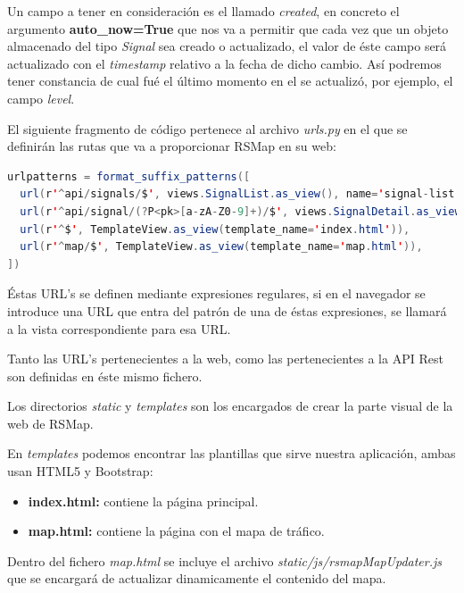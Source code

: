 Un campo a tener en consideración es el llamado \textit{created}, en concreto el argumento \textbf{auto\_now=True} que nos va a permitir que cada vez que un objeto almacenado del tipo \textit{Signal} sea creado o actualizado, el valor de éste campo será actualizado con el \textit{timestamp} relativo a la fecha de dicho cambio. Así podremos tener constancia de cual fué el último momento en el se actualizó, por ejemplo, el campo \textit{level}.


\newpage
El siguiente fragmento de código pertenece al archivo \textit{urls.py} en el que se definirán las rutas que va a proporcionar RSMap en su web:

\begin{lstlisting}[language=java,caption={Definición de URL's},label={lst:pi1}]
urlpatterns = format_suffix_patterns([
  url(r'^api/signals/$', views.SignalList.as_view(), name='signal-list'),
  url(r'^api/signal/(?P<pk>[a-zA-Z0-9]+)/$', views.SignalDetail.as_view(), name='signal-detail'),
  url(r'^$', TemplateView.as_view(template_name='index.html')),
  url(r'^map/$', TemplateView.as_view(template_name='map.html')),
])
\end{lstlisting}

Éstas URL's se definen mediante expresiones regulares, si en el navegador se introduce una URL que entra del patrón de una de éstas expresiones, se llamará a la vista correspondiente para esa URL.

Tanto las URL's pertenecientes a la web, como las pertenecientes a la API Rest son definidas en éste mismo fichero.

\bigskip

Los directorios \textit{static} y \textit{templates} son los encargados de crear la parte visual de la web de RSMap.

En \textit{templates} podemos encontrar las plantillas que sirve nuestra aplicación, ambas usan HTML5 y Bootstrap:

\begin{itemize}
	\item \textbf{index.html:} contiene la página principal.
	\item \textbf{map.html:} contiene la página con el mapa de tráfico.
\end{itemize}

\bigskip

Dentro del fichero \textit{map.html} se incluye el archivo \textit{static\//js\//rsmapMapUpdater.js} que se encargará de actualizar dinamicamente el contenido del mapa.

